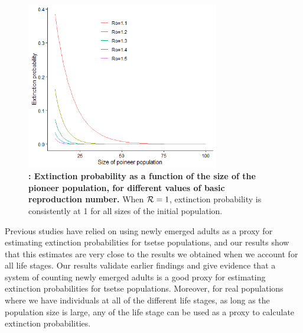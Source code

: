 \documentclass[smallextended]{svjour3}
\begin{document}
\begin{figure}[h]
	\includegraphics[width=0.75\textwidth]{ExtinctionRepNumberPoineerPop.png}
	\caption{{\bf: Extinction probability as a function of the size of the pioneer population, for different values of basic reproduction number.} When ${\cal R}=1$, extinction probability is consistently at 1 for all sizes of the initial population.}
	\label{ExtPoineerSize}
\end{figure}

Previous studies have relied on using newly emerged adults as a proxy for estimating extinction probabilities for tsetse populations, and our results show that this estimates are very close to the results we obtained when we account for all life stages. Our results validate earlier findings and give evidence that a system of counting newly emerged adults is a good proxy for estimating extinction probabilities for tsetse populations. Moreover, for real populations where we have individuals at all of the different life stages, as long as the population size is large, any of the life stage can be used as a proxy to calculate extinction probabilities. 
\end{document}
